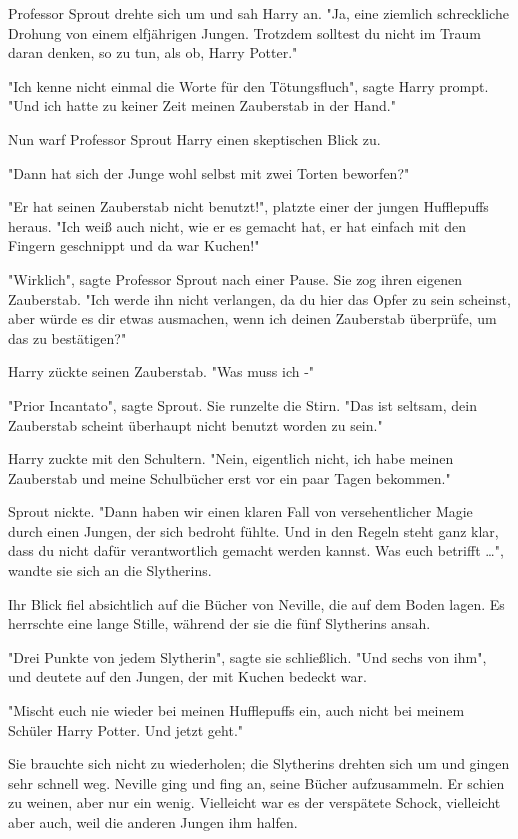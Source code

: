 {Professor Sprout drehte sich um und sah Harry an. "Ja, eine ziemlich schreckliche Drohung von einem elfjährigen Jungen. Trotzdem solltest du nicht im Traum daran denken, so zu tun, als ob, Harry Potter."

"Ich kenne nicht einmal die Worte für den Tötungsfluch", sagte Harry prompt. "Und ich hatte zu keiner Zeit meinen Zauberstab in der Hand."

Nun warf Professor Sprout Harry einen skeptischen Blick zu.

"Dann hat sich der Junge wohl selbst mit zwei Torten beworfen?"

"Er hat seinen Zauberstab nicht benutzt!", platzte einer der jungen Hufflepuffs heraus. "Ich weiß auch nicht, wie er es gemacht hat, er hat einfach mit den Fingern geschnippt und da war Kuchen!"

"Wirklich", sagte Professor Sprout nach einer Pause. Sie zog ihren eigenen Zauberstab. "Ich werde ihn nicht verlangen, da du hier das Opfer zu sein scheinst, aber würde es dir etwas ausmachen, wenn ich deinen Zauberstab überprüfe, um das zu bestätigen?"

Harry zückte seinen Zauberstab. "Was muss ich -"

"Prior Incantato", sagte Sprout. Sie runzelte die Stirn. "Das ist seltsam, dein Zauberstab scheint überhaupt nicht benutzt worden zu sein."

Harry zuckte mit den Schultern. "Nein, eigentlich nicht, ich habe meinen Zauberstab und meine Schulbücher erst vor ein paar Tagen bekommen."

Sprout nickte. "Dann haben wir einen klaren Fall von versehentlicher Magie durch einen Jungen, der sich bedroht fühlte. Und in den Regeln steht ganz klar, dass du nicht dafür verantwortlich gemacht werden kannst. Was euch betrifft …", wandte sie sich an die Slytherins.

Ihr Blick fiel absichtlich auf die Bücher von Neville, die auf dem Boden lagen. Es herrschte eine lange Stille, während der sie die fünf Slytherins ansah.

"Drei Punkte von jedem Slytherin", sagte sie schließlich. "Und sechs von ihm", und deutete auf den Jungen, der mit Kuchen bedeckt war.

"Mischt euch nie wieder bei meinen Hufflepuffs ein, auch nicht bei meinem Schüler Harry Potter. Und jetzt geht."

Sie brauchte sich nicht zu wiederholen; die Slytherins drehten sich um und gingen sehr schnell weg. Neville ging und fing an, seine Bücher aufzusammeln. Er schien zu weinen, aber nur ein wenig. Vielleicht war es der verspätete Schock, vielleicht aber auch, weil die anderen Jungen ihm halfen.

}
